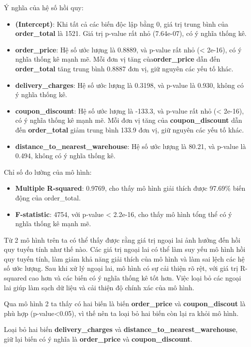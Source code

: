 Ý nghĩa của hệ số hồi quy:
\begin{itemize}
\item\textbf{(Intercept)}: Khi tất cả các biến độc lập bằng 0, giá trị trung bình của \textbf{order\_total} là 1521. Giá trị p-value rất nhỏ (7.64e-07), có ý nghĩa thống kê.
\item\textbf{order\_price}: Hệ số ước lượng là 0.8889, và p-value rất nhỏ (< 2e-16), có ý nghĩa thống kê mạnh mẽ. Mỗi đơn vị tăng của\textbf{order\_price} dẫn đến \textbf{order\_total} tăng trung bình 0.8887 đơn vị, giữ nguyên các yếu tố khác.\\
\item\textbf{delivery\_charges}: Hệ số ước lượng là 0.3198, và p-value là 0.930, không có ý nghĩa thống kê.
\item\textbf{coupon\_discount}: Hệ số ước lượng là -133.3, và p-value rất nhỏ (< 2e-16), có ý nghĩa thống kê mạnh mẽ. Mỗi đơn vị tăng của \textbf{coupon\_discount} dẫn đến \textbf{order\_total} giảm trung bình 133.9 đơn vị, giữ nguyên các yếu tố khác.
\item\textbf{distance\_to\_nearest\_warehouse}: Hệ số ước lượng là 80.21, và p-value là 0.494, không có ý nghĩa thống kê.
\end{itemize}

Chỉ số đo lường của mô hình:

\begin{itemize}
\item\textbf{Multiple R-squared}: 0.9769, cho thấy mô hình giải thích được 97.69\% biến động của order\_total.
\item\textbf{F-statistic}: 4754, với p-value < 2.2e-16, cho thấy mô hình tổng thể có ý nghĩa thống kê mạnh mẽ.
\end{itemize}

Từ 2 mô hình trên ta có thể thấy được rằng giá trị ngoại lai ảnh hưởng đến hồi quy tuyến tính như thế nào. Các giá trị ngoại lai có thể làm suy yếu mô hình hồi quy tuyến tính, làm giảm khả năng giải thích của mô hình và làm sai lệch các hệ số ước lượng. Sau khi xử lý ngoại lai, mô hình có sự cải thiện rõ rệt, với giá trị R-squared cao hơn và các biến có ý nghĩa thống kê tốt hơn. Việc loại bỏ các ngoại lai giúp làm sạch dữ liệu và cải thiện độ chính xác của mô hình.

Qua mô hình 2 ta thấy có hai biến là biến \textbf{order\_price} và \textbf{coupon\_discout} là phù hợp (p-value<0.05), vì thế nên ta loại bỏ hai biến còn lại ra khỏi mô hình.

Loại bỏ hai biến \textbf{delivery\_charges} và \textbf{distance\_to\_nearest\_warehouse}, giữ lại biến có ý nghĩa là \textbf{order\_price} và \textbf{coupon\_discount}.

